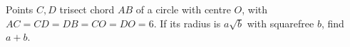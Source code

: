 Points $C,D$ trisect chord $AB$ of a circle with centre $O$, with $AC=CD=DB=CO=DO=6$. If its radius is $a\sqrt b$ with squarefree $b$, find $a+b$.

